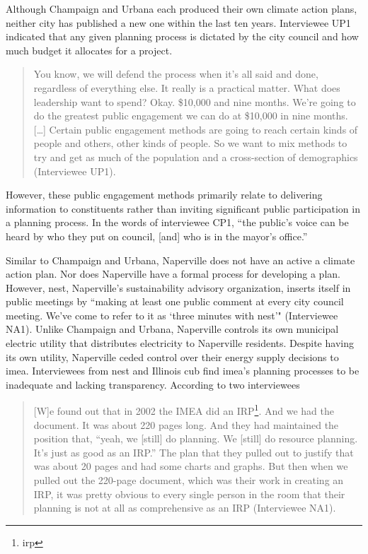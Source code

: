 Although Champaign and Urbana each produced their own climate action plans,
neither city has published a new one within the last ten years. Interviewee UP1
indicated that any given planning process is dictated by the city council and
how much budget it allocates for a project.
\begin{quote}
    You know, we will defend the process when it's all said and done, regardless
    of everything else. It really is a practical matter. What does leadership
    want to spend? Okay. \$10,000 and nine months. We're going to do the
    greatest public engagement we can do at \$10,000 in nine months. [\dots]
    Certain public engagement methods are going to reach certain kinds of people
    and others, other kinds of people. So we want to mix methods to try and get
    as much of the population and a cross-section of demographics (Interviewee
    UP1).
\end{quote}
However, these public engagement methods primarily relate to delivering
information to constituents rather than inviting significant public
participation in a planning process. In the words of interviewee CP1, ``the
public's voice can be heard by who they put on council, [and] who is in the
mayor's office.''

Similar to Champaign and Urbana, Naperville does not have an active a climate
action plan. Nor does Naperville have a formal process for developing a plan.
However, \ac{nest}, Naperville's sustainability advisory organization, inserts
itself in public meetings by ``making at least one public comment at every city
council meeting. We've come to refer to it as `three minutes with \ac{nest}'"
(Interviewee NA1). Unlike Champaign and Urbana, Naperville controls its own
municipal electric utility that distributes electricity to Naperville residents.
Despite having its own utility, Naperville ceded control over their energy
supply decisions to \ac{imea}. Interviewees from \ac{nest} and Illinois \ac{cub}
find \ac{imea}'s planning processes to be inadequate and lacking transparency.
According to two interviewees

\begin{quote}
    [W]e found out that in 2002 the IMEA did an IRP\footnote{\Acf{irp}}. And we
    had the document. It was about 220 pages long. And they had maintained the
    position that, ``yeah, we [still] do planning. We [still] do resource
    planning. It's just as good as an IRP.'' The plan that they pulled out to
    justify that was about 20 pages and had some charts and graphs. But then
    when we pulled out the 220-page document, which was their work in creating
    an IRP, it was pretty obvious to every single person in the room that their
    planning is not at all as comprehensive as an IRP (Interviewee NA1).
\end{quote}


